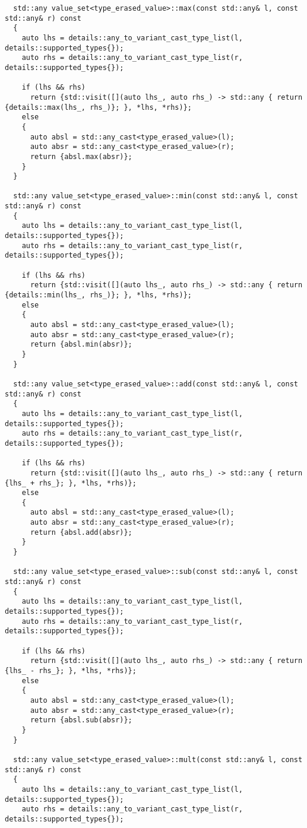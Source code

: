\begin{verbatim}
  std::any value_set<type_erased_value>::max(const std::any& l, const std::any& r) const
  {
    auto lhs = details::any_to_variant_cast_type_list(l, details::supported_types{});
    auto rhs = details::any_to_variant_cast_type_list(r, details::supported_types{});

    if (lhs && rhs)
      return {std::visit([](auto lhs_, auto rhs_) -> std::any { return {details::max(lhs_, rhs_)}; }, *lhs, *rhs)};
    else
    {
      auto absl = std::any_cast<type_erased_value>(l);
      auto absr = std::any_cast<type_erased_value>(r);
      return {absl.max(absr)};
    }
  }

  std::any value_set<type_erased_value>::min(const std::any& l, const std::any& r) const
  {
    auto lhs = details::any_to_variant_cast_type_list(l, details::supported_types{});
    auto rhs = details::any_to_variant_cast_type_list(r, details::supported_types{});

    if (lhs && rhs)
      return {std::visit([](auto lhs_, auto rhs_) -> std::any { return {details::min(lhs_, rhs_)}; }, *lhs, *rhs)};
    else
    {
      auto absl = std::any_cast<type_erased_value>(l);
      auto absr = std::any_cast<type_erased_value>(r);
      return {absl.min(absr)};
    }
  }

  std::any value_set<type_erased_value>::add(const std::any& l, const std::any& r) const
  {
    auto lhs = details::any_to_variant_cast_type_list(l, details::supported_types{});
    auto rhs = details::any_to_variant_cast_type_list(r, details::supported_types{});

    if (lhs && rhs)
      return {std::visit([](auto lhs_, auto rhs_) -> std::any { return {lhs_ + rhs_}; }, *lhs, *rhs)};
    else
    {
      auto absl = std::any_cast<type_erased_value>(l);
      auto absr = std::any_cast<type_erased_value>(r);
      return {absl.add(absr)};
    }
  }

  std::any value_set<type_erased_value>::sub(const std::any& l, const std::any& r) const
  {
    auto lhs = details::any_to_variant_cast_type_list(l, details::supported_types{});
    auto rhs = details::any_to_variant_cast_type_list(r, details::supported_types{});

    if (lhs && rhs)
      return {std::visit([](auto lhs_, auto rhs_) -> std::any { return {lhs_ - rhs_}; }, *lhs, *rhs)};
    else
    {
      auto absl = std::any_cast<type_erased_value>(l);
      auto absr = std::any_cast<type_erased_value>(r);
      return {absl.sub(absr)};
    }
  }

  std::any value_set<type_erased_value>::mult(const std::any& l, const std::any& r) const
  {
    auto lhs = details::any_to_variant_cast_type_list(l, details::supported_types{});
    auto rhs = details::any_to_variant_cast_type_list(r, details::supported_types{});


\end{verbatim}
